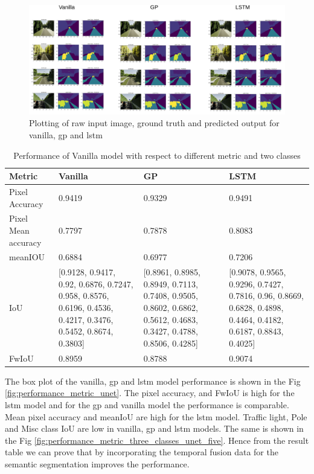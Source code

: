 	\begin{figure}
		\centering
		\includegraphics[width=17cm]{images/unet_vkitti_five.png}
		\caption{Plotting of raw input image, ground truth and predicted output for vanilla, gp and lstm}
		\label{fig:unet_side_by_side_five_classes}
	\end{figure}

	\begin{table}
		\begin{center}
			\begin{tabular}{ | l | p{4cm} | p{4cm} | p{4cm} |}
				\hline
				
				\cellcolor{purple!30}Metric & \cellcolor{purple!30}Vanilla & \cellcolor{purple!30}GP & \cellcolor{purple!30}LSTM\\ \hline
				Pixel Accuracy & 0.9419 & 0.9329 & 0.9491 \\ \hline
				Pixel Mean accuracy & 0.7797 & 0.7878 & 0.8083 \\ \hline
				meanIOU & 0.6884 & 0.6977 & 0.7206 \\ \hline
				IoU & [0.9128, 0.9417, 0.92, 0.6876, 0.7247, 0.958, 0.8576, 0.6196, 0.4536, 0.4217, 0.3476, 0.5452, 0.8674, 0.3803] & 
				[0.8961, 0.8985, 0.8949, 0.7113, 0.7408, 0.9505, 0.8602, 0.6862, 0.5612, 0.4683, 0.3427, 0.4788, 0.8506, 0.4285]
				& [0.9078, 0.9565, 0.9296, 0.7427, 0.7816, 0.96, 0.8669, 0.6828, 0.4898, 0.4464, 0.4182, 0.6187, 0.8843, 0.4025]
				\\ \hline
				FwIoU & 0.8959 & 0.8788 & 0.9074 \\ \hline
				\hline
			\end{tabular}
			\caption{Performance of Vanilla model with respect to different metric and two classes}
			\label{table:Vanilla_conti_seq}
		\end{center}
	\end{table}
	
	The box plot of the vanilla, gp and lstm model performance is shown in the Fig \ref{fig:performance_metric_unet}. The pixel accuracy, and  FwIoU is high for the lstm model and for the gp and vanilla model the performance is comparable. Mean pixel accuracy and meanIoU are high for the lstm model. Traffic light, Pole and Misc class IoU are low in vanilla, gp and lstm models. The same is shown in the Fig \ref{fig:performance_metric_three_classes_unet_five}. Hence from the result table we can prove that by incorporating the temporal fusion data for the semantic segmentation improves the performance.
	
